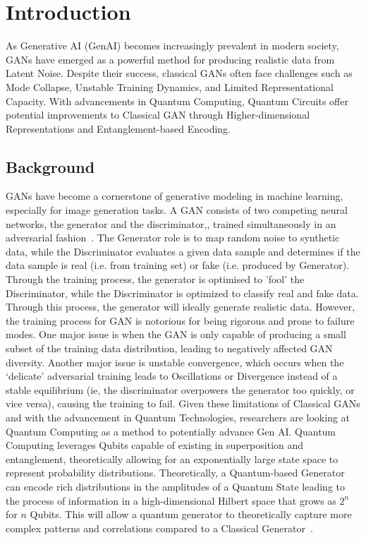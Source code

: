 
\chapter{Introduction}
\vspace{2em}

As Generative AI (GenAI) becomes increasingly prevalent in modern society, GANs have emerged as a powerful method for producing realistic data from Latent Noise. Despite their success, classical GANs often face challenges such as Mode Collapse, Unstable Training Dynamics, and Limited Representational Capacity. With advancements in Quantum Computing, Quantum Circuits offer potential improvements to Classical GAN through Higher-dimensional Representations and Entanglement-based Encoding.

\section{Background}

GANs have become a cornerstone of generative modeling in machine learning, especially for image generation tasks. A GAN consists of two competing neural networks, the generator and the discriminator,, trained simultaneously in an adversarial fashion~\cite{goodfellow2014gan}. The Generator role is to map random noise to synthetic data, while the Discriminator evaluates a given data sample and determines if the data sample is real (i.e. from training set) or fake (i.e. produced by Generator). Through the training process, the generator is optimised to 'fool' the Discriminator, while the Discriminator is optimized to classify real and fake data. Through this process, the generator will ideally generate realistic data.
However, the training process for GAN is notorious for being rigorous and prone to failure modes. One major issue is when the GAN is only capable of producing a small subset of the training data distribution, leading to negatively affected GAN diversity. Another major issue is unstable convergence, which occurs when the ‘delicate’ adversarial training leads to Oscillations or Divergence instead of a stable equilibrium (ie, the discriminator overpowers the generator too quickly, or vice versa), causing the training to fail.
Given these limitations of Classical GANs and with the advancement in Quantum Technologies, researchers are looking at Quantum Computing as a method to potentially advance Gen AI. Quantum Computing leverages Qubits capable of existing in superposition and entanglement, theoretically allowing for an exponentially large state space to represent probability distributions. Theoretically, a Quantum-based Generator can encode rich distributions in the amplitudes of a Quantum State leading to the process of information in a high-dimensional Hilbert space that grows as $2^n$ for $n$ Qubits. This will allow a quantum generator to theoretically capture more complex patterns and correlations compared to a Classical Generator~\cite{zoufal2019qgan}.

